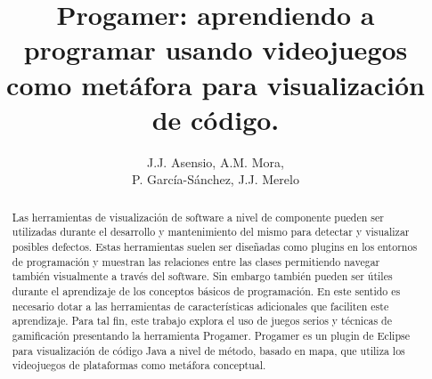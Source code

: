 \documentclass{llncs}
\begin{document}

\title{Progamer: aprendiendo a programar usando videojuegos como metáfora para visualización de código.}


\author{J.J. Asensio, A.M. Mora, \\P. García-Sánchez, J.J. Merelo}

\maketitle
%
%
\begin{abstract} 
Las herramientas de visualización de software a nivel de componente
pueden ser utilizadas durante el desarrollo y mantenimiento del mismo
para detectar y visualizar posibles defectos. Estas herramientas
suelen ser diseñadas como plugins en los entornos de programación y
muestran las relaciones entre las clases permitiendo navegar también
visualmente a través del software. Sin embargo también pueden ser
útiles durante el aprendizaje de los conceptos básicos de
programación. En este sentido es necesario dotar a las herramientas de
características adicionales que faciliten este aprendizaje. Para tal
fin, este trabajo explora el uso de juegos serios y técnicas de
gamificación presentando la herramienta Progamer. Progamer es un
plugin de Eclipse para visualización de código Java a nivel de método,
basado en mapa, que utiliza los videojuegos de plataformas como metáfora conceptual.
\end{abstract}


%
%
\end{document}
